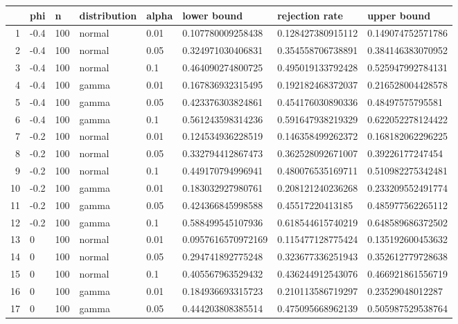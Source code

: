 \begin{table}[ht]
\centering
\begin{tabular}{rlllllll}
  \hline
 & phi & n & distribution & alpha & lower bound & rejection rate & upper bound \\ 
  \hline
1 & -0.4 & 100 & normal & 0.01 & 0.107780009258438 & 0.128427380915112 & 0.149074752571786 \\ 
  2 & -0.4 & 100 & normal & 0.05 & 0.324971030406831 & 0.354558706738891 & 0.384146383070952 \\ 
  3 & -0.4 & 100 & normal & 0.1 & 0.464090274800725 & 0.495019133792428 & 0.525947992784131 \\ 
  4 & -0.4 & 100 & gamma & 0.01 & 0.167836932315495 & 0.192182468372037 & 0.216528004428578 \\ 
  5 & -0.4 & 100 & gamma & 0.05 & 0.423376303824861 & 0.454176030890336 & 0.48497575795581 \\ 
  6 & -0.4 & 100 & gamma & 0.1 & 0.561243598314236 & 0.591647938219329 & 0.622052278124422 \\ 
  7 & -0.2 & 100 & normal & 0.01 & 0.124534936228519 & 0.146358499262372 & 0.168182062296225 \\ 
  8 & -0.2 & 100 & normal & 0.05 & 0.332794412867473 & 0.362528092671007 & 0.39226177247454 \\ 
  9 & -0.2 & 100 & normal & 0.1 & 0.449170794996941 & 0.480076535169711 & 0.510982275342481 \\ 
  10 & -0.2 & 100 & gamma & 0.01 & 0.183032927980761 & 0.208121240236268 & 0.233209552491774 \\ 
  11 & -0.2 & 100 & gamma & 0.05 & 0.424366845998588 & 0.45517220413185 & 0.485977562265112 \\ 
  12 & -0.2 & 100 & gamma & 0.1 & 0.588499545107936 & 0.618544615740219 & 0.648589686372502 \\ 
  13 & 0 & 100 & normal & 0.01 & 0.0957616570972169 & 0.115477128775424 & 0.135192600453632 \\ 
  14 & 0 & 100 & normal & 0.05 & 0.294741892775248 & 0.323677336251943 & 0.352612779728638 \\ 
  15 & 0 & 100 & normal & 0.1 & 0.405567963529432 & 0.436244912543076 & 0.466921861556719 \\ 
  16 & 0 & 100 & gamma & 0.01 & 0.184936693315723 & 0.210113586719297 & 0.23529048012287 \\ 
  17 & 0 & 100 & gamma & 0.05 & 0.444203808385514 & 0.475095668962139 & 0.505987529538764 \\ 

\end{tabular}
\end{table}
